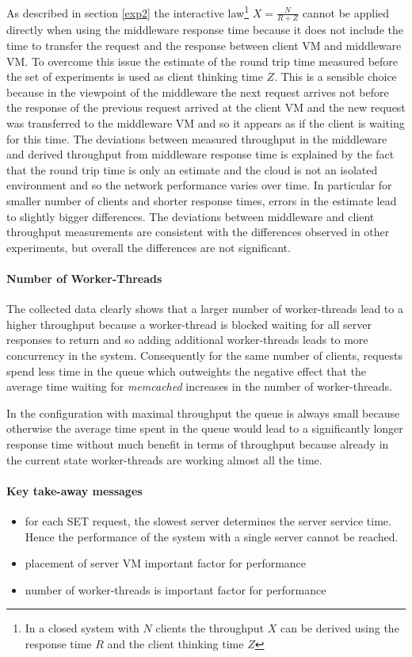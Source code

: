 \documentclass[report.tex]{subfiles}
\begin{document}
As described in section \ref{exp2} the interactive law\footnote{In a closed system with $N$ clients the throughput $X$ can be derived using the response time $R$ and the client thinking time $Z$} $X = \frac{N}{R+Z}$ cannot be applied directly when using the middleware response time because it does not include the time to transfer the request and the response between client VM and middleware VM. To overcome this issue the estimate of the round trip time measured before the set of experiments is used as client thinking time $Z$. This is a sensible choice because in the viewpoint of the middleware the next request arrives not before the response of the previous request arrived at the client VM and the new request was transferred to the middleware VM and so it appears as if the client is waiting for this time.
The deviations between measured throughput in the middleware and derived throughput from middleware response time is explained by the fact that the round trip time is only an estimate and the cloud is not an isolated environment and so the network performance varies over time. In particular for smaller number of clients and shorter response times, errors in the estimate lead to slightly bigger differences.
The deviations between middleware and client throughput measurements are consistent with the differences observed in other experiments, but overall the differences are not significant.


\paragraph{Number of Worker-Threads}
The collected data clearly shows that a larger number of worker-threads lead to a higher throughput because a worker-thread is blocked waiting for all server responses to return and so adding additional worker-threads leads to more concurrency in the system. Consequently for the same number of clients, requests spend less time in the queue which outweights the negative effect that the average time waiting for \emph{memcached} increases in the number of worker-threads.

In the configuration with maximal throughput the queue is always small because otherwise the average time spent in the queue would lead to a significantly longer response time without much benefit in terms of throughput because already in the current state worker-threads are working almost all the time. 


\paragraph{Key take-away messages}
\begin{itemize}
	\vitemsep
	\item for each SET request, the slowest server determines the server service time. Hence the performance of the system with a single server cannot be reached.
	\item placement of server VM important factor for performance
	\item number of worker-threads is important factor for performance
\end{itemize}
\end{document}
